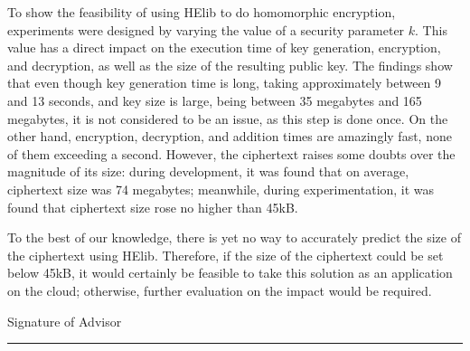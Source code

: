 To show the feasibility of using HElib to do homomorphic encryption, experiments were designed by varying the value of a security parameter $k$. This value has a direct impact on the execution time of key generation, encryption, and decryption, as well as the size of the resulting public key. The findings show that even though key generation time is long, taking approximately between 9 and 13 seconds, and key size is large, being between 35 megabytes and 165 megabytes, it is not considered to be an issue, as this step is done once. On the other hand, encryption, decryption, and addition times are amazingly fast, none of them exceeding a second. However, the ciphertext raises some doubts over the magnitude of its size: during development, it was found that on average, ciphertext size was 74 megabytes; meanwhile, during experimentation, it was found that ciphertext size rose no higher than 45kB.

To the best of our knowledge, there is yet no way to accurately predict the size of the ciphertext using HElib. Therefore, if the size of the ciphertext could be set below 45kB, it would certainly be feasible to take this solution as an application on the cloud; otherwise, further evaluation on the impact would be required.

\noindent Signature of Advisor \rule{72mm}{0.3pt}

\vspace*{-4mm}
\noindent \phantom{Advisor signature: m} \asesor
